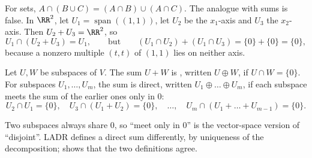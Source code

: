 \documentclass[10pt]{scrartcl}
\DeclareMathOperator{\spn}{span}
\begin{document}
\begin{example*}
  For sets, $A\cap(B\cup C)=(A\cap B)\cup(A\cap C)$. The analogue with sums is false. In $\RR^2$, let $U_1=\spn((1,1))$, let $U_2$ be the $x_1$-axis and $U_3$ the $x_2$-axis. Then $U_2+U_3=\RR^2$, so
  \[
    U_1\cap(U_2+U_3)=U_1,\qquad\text{but}\qquad (U_1\cap U_2)+(U_1\cap U_3)=\{0\}+\{0\}=\{0\},
  \]
  because a nonzero multiple $(t,t)$ of $(1,1)$ lies on neither axis.
\end{example*}

\begin{definition*}
  Let $U,W$ be subspaces of $V$. The sum $U+W$ is , written $U\oplus W$, if $U\cap W=\{0\}$. For subspaces $U_1,\dots,U_m$, the sum is direct, written $U_1\oplus\dots\oplus U_m$, if each subspace meets the sum of the earlier ones only in $0$:
  \[
    U_2\cap U_1=\{0\},\quad U_3\cap(U_1+U_2)=\{0\},\quad\dots,\quad U_m\cap(U_1+\dots+U_{m-1})=\{0\}.
  \]
\end{definition*}

Two subspaces always share $0$, so ``meet only in $0$'' is the vector-space version of ``disjoint''. LADR defines a direct sum differently, by uniqueness of the decomposition;  shows that the two definitions agree.
\end{document}
